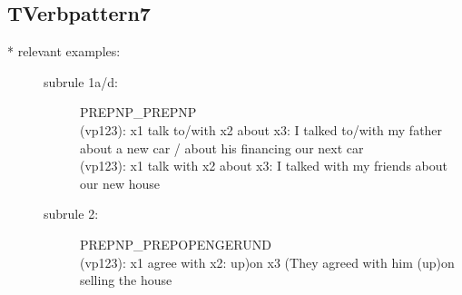 \subsection{TVerbpattern7}
\begin{description}
\item[* relevant examples:] \mbox{}
\begin{description}
\item[subrule 1a/d:] PREPNP\_PREPNP\\
  (vp123): x1 talk to/with x2 about x3: I talked to/with my father about a 
  new car / about his financing our next car\\
  (vp123): x1 talk with x2 about x3: I talked with my 
  friends about our new house  
\item[subrule 2:] PREPNP\_PREPOPENGERUND\\
  (vp123): x1 agree with x2: up)on x3 (They agreed with him (up)on selling the 
  house\\
\end{description}
\end{description}

